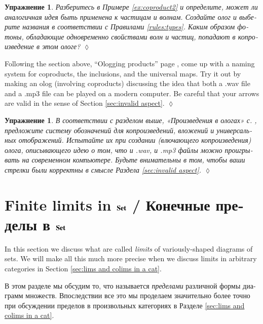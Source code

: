 \documentclass[a4paper]{book}
\def\Set{{\bf Set}}
\theoremstyle{myth}
\newtheorem{excENG}[envENG]{\begin{english}Exercise\end{english}}
\newenvironment{exerciseENG}{\begin{excENG}}{\hspace*{\fill}$\lozenge$\end{excENG}}
\newtheorem{excRUS}[envRUS]{Упражнение}
\newenvironment{exerciseRUS}{\begin{excRUS}}{\hspace*{\fill}$\lozenge$\end{excRUS}}
\begin{document}
\begin{russian}
\begin{exerciseRUS}
Разберитесь в Примере \ref{ex:coproduct2} и определите, может ли аналогичная идея быть применена к частицам и волнам. Создайте олог и выберите названия в соответствии с Правилами \ref{rules:types}. Каким образом фотоны, обладающие одновременно свойствами волн и частиц, попадают в копроизведение в этом ологе?
\end{exerciseRUS}

\begin{exerciseENG}
Following the section above, “Ologging products” page \pageref{sec:ologging products}, come up with a naming system for coproducts, the inclusions, and the universal maps. Try it out by making an olog (involving coproducts) discussing the idea that both a .wav file and a .mp3 file can be played on a modern computer. Be careful that your arrows are valid in the sense of Section \ref{sec:invalid aspect}.
\end{exerciseENG}

\begin{exerciseRUS}
В соответствии с разделом выше, «Произведения в ологах» с. \pageref{sec:ologging products}, предложите систему обозначений для копроизведений, вложений и универсальных отображений. Испытайте их при создании (влючающего копроизведения) олога, описывающего идею о том, что и .wav, и .mp3 файлы можно проигрывать на современном компьютере. Будьте внимательны в том, чтобы ваши стрелки были корректны в смысле Раздела \ref{sec:invalid aspect}.
\end{exerciseRUS}


\section{Finite limits in $\Set$ / Конечные пределы в $\Set$}\label{sec:finite limits}

In this section we discuss what are called {\em limits} of variously-shaped diagrams of sets. We will make all this much more precise when we discuss limits in arbitrary categories in Section \ref{sec:lims and colims in a cat}.

В этом разделе мы обсудим то, что называется {\em пределами} различной формы диаграмм множеств. Впоследствии все это мы проделаем значительно более точно при обсуждении пределов в произвольных категориях в Разделе \ref{sec:lims and colims in a cat}.



\end{russian}
\end{document}
